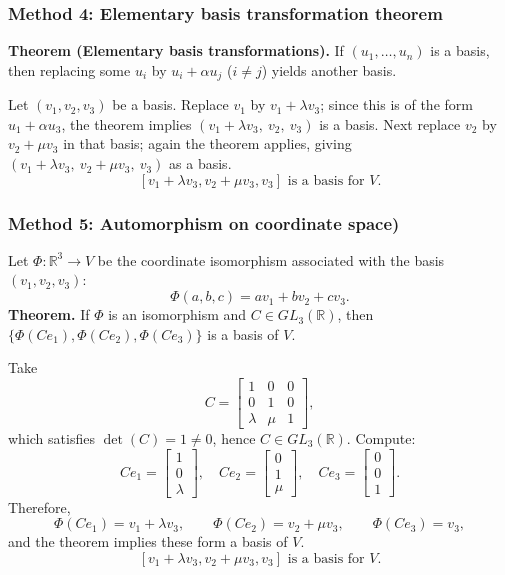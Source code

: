 \documentclass[12pt]{article}
\let\amsboxed\boxed
\renewcommand{\boxed}[1]{\amsboxed{\,#1\,}}
\begin{document}
\subsubsection{Method 4: Elementary basis transformation theorem}
\textbf{Theorem (Elementary basis transformations).}
If $(u_1,\dots,u_n)$ is a basis, then replacing some $u_i$ by $u_i+\alpha u_j$ ($i\neq j$) yields another basis.

Let $(v_1,v_2,v_3)$ be a basis. Replace $v_1$ by $v_1+\lambda v_3$; since this is of the form $u_1+\alpha u_3$, the theorem implies $(v_1+\lambda v_3,\ v_2,\ v_3)$ is a basis.
Next replace $v_2$ by $v_2+\mu v_3$ in that basis; again the theorem applies, giving $(v_1+\lambda v_3,\ v_2+\mu v_3,\ v_3)$ as a basis.
\[
\boxed{\, [v_1 + \lambda v_3, v_2 + \mu v_3, v_3]\text{ is a basis for }V. \,}
\]
\newpage
\subsubsection{Method 5: Automorphism on coordinate space)}
Let $\Phi:\mathbb{R}^3\to V$ be the coordinate isomorphism associated with the basis $(v_1,v_2,v_3)$:
\[
\Phi(a,b,c)=av_1+bv_2+cv_3.
\]
\textbf{Theorem.} If $\Phi$ is an isomorphism and $C\in GL_3(\mathbb{R})$, then $\{\Phi(Ce_1),\Phi(Ce_2),\Phi(Ce_3)\}$ is a basis of $V$.

Take
\[
C=\begin{bmatrix}
1&0&0\\
0&1&0\\
\lambda&\mu&1
\end{bmatrix},
\]
which satisfies $\det(C)=1\neq 0$, hence $C\in GL_3(\mathbb{R})$.
Compute:
\[
Ce_1=\begin{bmatrix}1\\0\\\lambda\end{bmatrix},\quad
Ce_2=\begin{bmatrix}0\\1\\\mu\end{bmatrix},\quad
Ce_3=\begin{bmatrix}0\\0\\1\end{bmatrix}.
\]
Therefore,
\[
\Phi(Ce_1)=v_1+\lambda v_3,\qquad \Phi(Ce_2)=v_2+\mu v_3,\qquad \Phi(Ce_3)=v_3,
\]
and the theorem implies these form a basis of $V$.
\[
\boxed{\, [v_1 + \lambda v_3, v_2 + \mu v_3, v_3]\text{ is a basis for }V. \,}
\]
\bigskip
\end{document}
